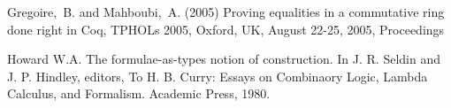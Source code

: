 \documentclass{jfp1}
\begin{document}



\begin{thebibliography}{}
   Gregoire,~B. and Mahboubi,~A. (2005) Proving equalities in a commutative ring done right in Coq, TPHOLs 2005, Oxford, UK, August 22-25, 2005, Proceedings


   Howard W.A. The formulae-as-types notion of construction. In J. R. Seldin and J. P. Hindley, editors, To H. B. Curry: Essays on Combinaory Logic, Lambda Calculus, and Formalism. Academic Press, 1980.


\end{thebibliography}

\label{lastpage}
\end{document}

